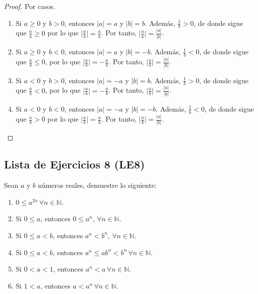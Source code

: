 \documentclass[11pt]{article}
\newcommand{\N}{\mathbb{N}}
\newcommand{\Z}{\mathbb{Z}}
\newcommand{\bfit}[1]{\textbf{\textit{#1}}}
\let\set\Set
\let\union\cup
\begin{document}
\begin{enumerate}[label=\alph*)]
\begin{proof} Por casos.
 \begin{enumerate}[label=\roman*)]
  \item Si $a \geq 0$ y $b>0$, entonces $|a|=a$ y $|b|=b$. Además, $\frac{1}{b} >0$, de donde sigue que $\frac{a}{b} \geq 0$ por lo que $\big| \frac{a}{b} \big| = \frac{a}{b}$. Por tanto, $ \big| \frac{a}{b} \big| = \frac{|a|}{|b|}$.
  \item Si $a \geq 0$ y $b<0$, entonces $|a|=a$ y $|b|=-b$. Además, $\frac{1}{b} <0$, de donde sigue que $\frac{a}{b} \leq 0$, por lo que $\big| \frac{a}{b} \big| =- \frac{a}{b}$. Por tanto, $ \big| \frac{a}{b} \big| = \frac{|a|}{|b|}$.
  \item Si $a<0$ y $b>0$, entonces $|a|=-a$ y $|b|=b$. Además, $\frac{1}{b} >0$, de donde sigue que $\frac{a}{b} < 0$, por lo que $\big| \frac{a}{b} \big| =- \frac{a}{b}$. Por tanto, $ \big| \frac{a}{b} \big| = \frac{|a|}{|b|}$.
  \item Si $a<0$ y $b<0$, entonces $|a|=-a$ y $|b|=-b$. Además, $\frac{1}{b} <0$, de donde sigue que $\frac{a}{b} > 0$ por lo que $\big| \frac{a}{b} \big| = \frac{a}{b}$. Por tanto, $ \big| \frac{a}{b} \big| = \frac{|a|}{|b|}$. \qedhere
 \end{enumerate} 
\end{proof}

\end{enumerate}




\subsection*{Lista de Ejercicios 8 (LE8)}

Sean $a$ y $b$ números reales, demuestre lo siguiente:

\begin{enumerate}[label=\alph*)]
 \item $0 \leq a^{2n} \, \forall n\in \N$.
 \item Si $0\leq a$, entonces $ 0 \leq a^n, \, \forall n\in \N$.
 \item Si $0 \leq a <b$, entonces $a^n < b^n, \, \forall n\in \N$.
 \item Si $0 \leq a <b$, entonces $a^n \leq ab^n < b^n \, \forall n\in \N$.
 \item Si $0<a<1$, entonces $a^n<a \, \forall n\in \N$.
 \item Si $1<a$, entonces $a<a^n \, \forall n\in \N$.
\end{enumerate}
\end{document}
